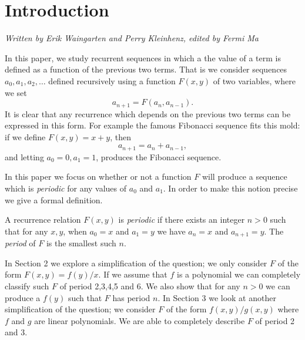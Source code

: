 \documentclass[12pt]{article}
\begin{document}
\maketitle

\section{Introduction}
\emph{Written by Erik Waingarten and Perry Kleinhenz, edited by Fermi Ma}

In this paper, we study recurrent sequences in which a the value of a term is defined as a function of the previous two terms. That is we consider sequences $a_0, a_1, a_2, \dots$ defined recursively using a function $F(x,y)$ of two variables, where we set
\begin{equation*}
a_{n+1} = F(a_n, a_{n-1}).
\end{equation*}
It is clear that any recurrence which depends on the previous two terms can be expressed in this form. For example the famous Fibonacci sequence fits this mold: if we define $F(x,y) = x + y$, then 
\begin{equation*}
a_{n+1} = a_n + a_{n-1},
\end{equation*}
and letting $a_0 =0 , a_1 = 1$, produces the Fibonacci sequence. 

In this paper we focus on whether or not a function $F$ will produce a sequence which is \emph{periodic} for any values of $a_0$ and $a_1$. In order to make this notion precise we give a formal definition.
\begin{definition}
A recurrence relation $F(x,y)$ is \textit{periodic} if  there exists an integer $n>0$ such that for any $x,y$, when $a_0 = x$ and $a_1 = y$ we have $a_n = x$ and $a_{n+1} = y$. The \emph{period} of $F$ is the smallest such $n$. 
\end{definition}


In Section 2 we explore a simplification of the question; we only consider $F$ of the form $F(x,y)=f(y)/x$. If we assume that $f$ is a polynomial we can completely classify such $F$ of period 2,3,4,5 and 6. We also show that for any $n>0$ we can produce a $f(y)$ such that $F$ has period $n$.  In Section 3 we look at another simplification of the question; we consider $F$ of the form $f(x,y)/g(x,y)$ where $f$ and $g$ are linear polynomials. We are able to completely describe $F$ of period 2 and 3. 
\end{document}
